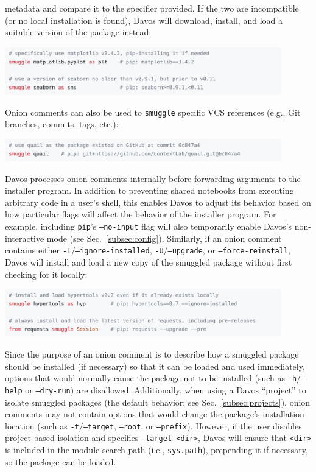 \documentclass[preprint,12pt,a4paper]{elsarticle}
\begin{document}
metadata and compare it to the specifier provided. If the two are incompatible
(or no local installation is found), Davos will download, install, and load a
suitable version of the package instead:
\begin{center}
  \includegraphics[width=0.9\textwidth]{figs/snippet3}
\end{center}
Onion comments can also be used to \texttt{smuggle} specific VCS references (e.g.,
Git~\cite{TorvHama05} branches, commits, tags, etc.):
\begin{center}
  \includegraphics[width=0.9\textwidth]{figs/snippet4}
\end{center}
Davos processes onion comments internally before forwarding arguments to the
installer program. In addition to preventing shared notebooks from executing
arbitrary code in a user's shell, this enables Davos to adjust its behavior
based on how particular flags will affect the behavior of the installer
program. For example, including \texttt{pip}'s \texttt{--no-input} flag will also
temporarily enable Davos's non-interactive mode (see Sec.~\ref{subsec:config}).
Similarly, if an onion comment contains either \texttt{-I}/\texttt{--ignore-installed},
\texttt{-U}/\texttt{--upgrade}, or \texttt{--force-reinstall}, Davos will
install and load a new copy of the smuggled package without first checking
for it locally:
\begin{center}
  \includegraphics[width=0.9\textwidth]{figs/snippet5}
\end{center}
Since the purpose of an onion comment is to describe how a smuggled package
should be installed (if necessary) so that it can be loaded and used
immediately, options that would normally cause the package not to be installed
(such as \texttt{-h}/\texttt{--help} or \texttt{--dry-run}) are disallowed. Additionally,
when using a Davos ``project'' to isolate smuggled packages (the default behavior;
see Sec.~\ref{subsec:projects}), onion comments may not contain options that
would change the package's installation location (such as
\texttt{-t}/\texttt{--target}, \texttt{--root}, or \texttt{--prefix}). However, if
the user disables project-based isolation and specifies \texttt{--target <dir>},
Davos will ensure that \texttt{<dir>} is included in the module search path (i.e.,
\texttt{sys.path}), prepending it if necessary, so the package can be loaded.
\end{document}
